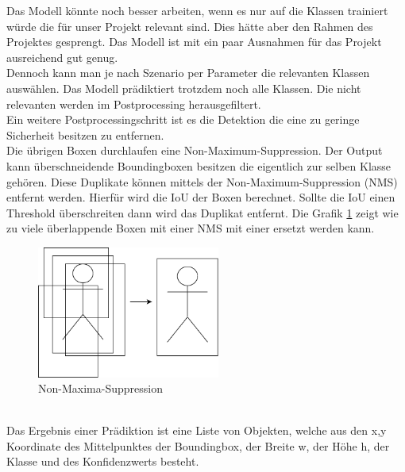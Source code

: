 \documentclass[conference]{IEEEtran}
\begin{document}
	Das Modell könnte noch besser arbeiten, wenn es nur auf die Klassen trainiert würde die für unser Projekt relevant sind. Dies hätte aber den Rahmen des Projektes gesprengt. Das Modell ist mit ein paar Ausnahmen für das Projekt ausreichend gut genug.\\
	Dennoch kann man je nach Szenario per Parameter die relevanten Klassen auswählen. Das Modell prädiktiert trotzdem noch alle Klassen. Die nicht relevanten werden im Postprocessing herausgefiltert.\\
	Ein weitere Postprocessingschritt ist es die Detektion die eine zu geringe Sicherheit besitzen zu entfernen.\\
	Die übrigen Boxen durchlaufen eine Non-Maximum-Suppression.
	Der Output kann überschneidende Boundingboxen besitzen die eigentlich zur selben Klasse gehören. Diese Duplikate können mittels der Non-Maximum-Suppression (NMS) entfernt werden. Hierfür wird die IoU der Boxen berechnet. Sollte die IoU einen Threshold überschreiten dann wird das Duplikat entfernt. Die Grafik \ref{NMS} zeigt wie zu viele überlappende Boxen mit einer NMS mit einer ersetzt werden kann.\\
	\begin{figure}[!h]
		\begin{center}
			\includegraphics[width=6cm]{Media/NMS.png}
			\caption{Non-Maxima-Suppression}
			\label{NMS}
		\end{center}
	\end{figure}\\
	Das Ergebnis einer Prädiktion ist eine Liste von Objekten, welche aus den x,y Koordinate des Mittelpunktes der Boundingbox, der Breite w, der Höhe h, der Klasse und des Konfidenzwerts besteht.
	
\end{document}

